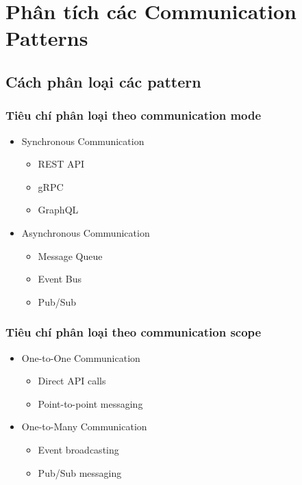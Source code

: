 \chapter{Phân tích các Communication Patterns}

\section{Cách phân loại các pattern}
\subsection{Tiêu chí phân loại theo communication mode}
\begin{itemize}
    \item Synchronous Communication
    \begin{itemize}
        \item REST API
        \item gRPC
        \item GraphQL
    \end{itemize}
    \item Asynchronous Communication
    \begin{itemize}
        \item Message Queue
        \item Event Bus
        \item Pub/Sub
    \end{itemize}
\end{itemize}

\subsection{Tiêu chí phân loại theo communication scope}
\begin{itemize}
    \item One-to-One Communication
    \begin{itemize}
        \item Direct API calls
        \item Point-to-point messaging
    \end{itemize}
    \item One-to-Many Communication
    \begin{itemize}
        \item Event broadcasting
        \item Pub/Sub messaging
    \end{itemize}
\end{itemize}

